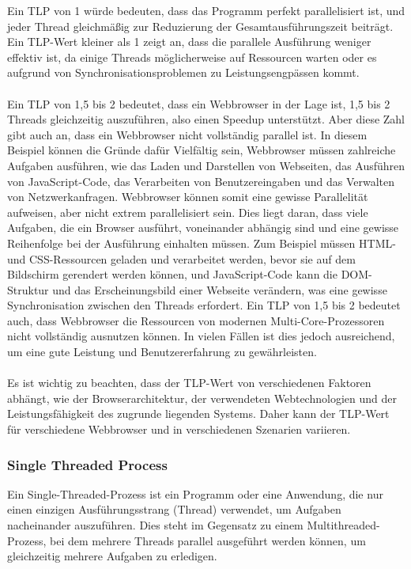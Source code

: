 \documentclass[../vs-script-first-v01.tex]{subfiles}
\begin{document}
Ein TLP von 1 würde bedeuten, dass das Programm perfekt parallelisiert ist, und jeder Thread gleichmäßig zur Reduzierung der Gesamtausführungszeit beiträgt. Ein TLP-Wert kleiner als 1 zeigt an, dass die parallele Ausführung weniger effektiv ist, da einige Threads möglicherweise auf Ressourcen warten oder es aufgrund von Synchronisationsproblemen zu Leistungsengpässen kommt.\\\\

Ein TLP von 1,5 bis 2 bedeutet, dass ein Webbrowser in der Lage ist, 1,5 bis 2 Threads gleichzeitig auszuführen, also einen Speedup unterstützt. Aber diese Zahl gibt auch an, dass ein Webbrowser nicht vollständig parallel ist. In diesem Beispiel können die Gründe dafür Vielfältig sein, Webbrowser müssen zahlreiche Aufgaben ausführen, wie das Laden und Darstellen von Webseiten, das Ausführen von JavaScript-Code, das Verarbeiten von Benutzereingaben und das Verwalten von Netzwerkanfragen. 
Webbrowser können somit eine gewisse Parallelität aufweisen, aber nicht extrem parallelisiert sein. Dies liegt daran, dass viele Aufgaben, die ein Browser ausführt, voneinander abhängig sind und eine gewisse Reihenfolge bei der Ausführung einhalten müssen. Zum Beispiel müssen HTML- und CSS-Ressourcen geladen und verarbeitet werden, bevor sie auf dem Bildschirm gerendert werden können, und JavaScript-Code kann die DOM-Struktur und das Erscheinungsbild einer Webseite verändern, was eine gewisse Synchronisation zwischen den Threads erfordert.
Ein TLP von 1,5 bis 2 bedeutet auch, dass Webbrowser die Ressourcen von modernen Multi-Core-Prozessoren nicht vollständig ausnutzen können. In vielen Fällen ist dies jedoch ausreichend, um eine gute Leistung und Benutzererfahrung zu gewährleisten.\\\\

Es ist wichtig zu beachten, dass der TLP-Wert von verschiedenen Faktoren abhängt, wie der Browserarchitektur, der verwendeten Webtechnologien und der Leistungsfähigkeit des zugrunde liegenden Systems. Daher kann der TLP-Wert für verschiedene Webbrowser und in verschiedenen Szenarien variieren.

\subsubsection{Single Threaded Process}
Ein Single-Threaded-Prozess ist ein Programm oder eine Anwendung, die nur einen einzigen Ausführungsstrang (Thread) verwendet, um Aufgaben nacheinander auszuführen. Dies steht im Gegensatz zu einem Multithreaded-Prozess, bei dem mehrere Threads parallel ausgeführt werden können, um gleichzeitig mehrere Aufgaben zu erledigen.
\end{document}
